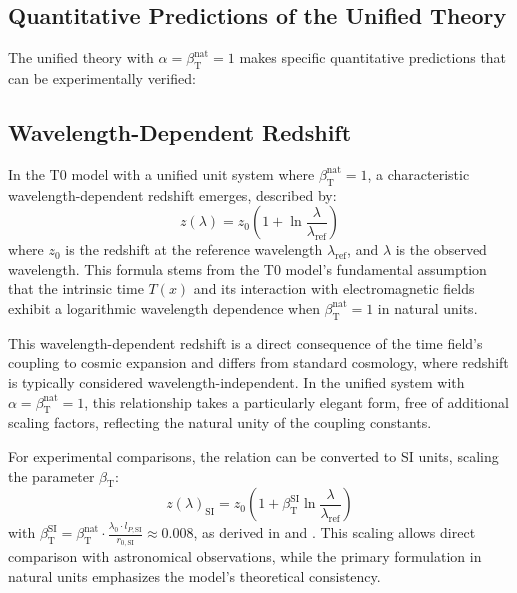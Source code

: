 ﻿\documentclass[12pt,a4paper]{article}
\newcommand{\Tfield}{T(x)}
\newcommand{\betaT}{\beta_{\text{T}}}
\begin{document}
	\subsection{Quantitative Predictions of the Unified Theory}
	
	The unified theory with \(\alpha = \betaT^{\text{nat}} = 1\) makes specific quantitative predictions that can be experimentally verified:
	
	\subsection{Wavelength-Dependent Redshift}
	
	In the T0 model with a unified unit system where \(\betaT^{\text{nat}} = 1\), a characteristic wavelength-dependent redshift emerges, described by:
	\begin{equation}
		z(\lambda) = z_0 \left(1 + \ln \frac{\lambda}{\lambda_{\text{ref}}}\right)
	\end{equation}
	where \(z_0\) is the redshift at the reference wavelength \(\lambda_{\text{ref}}\), and \(\lambda\) is the observed wavelength. This formula stems from the T0 model's fundamental assumption that the intrinsic time \(\Tfield\) and its interaction with electromagnetic fields exhibit a logarithmic wavelength dependence when \(\betaT^{\text{nat}} = 1\) in natural units.
	
	This wavelength-dependent redshift is a direct consequence of the time field's coupling to cosmic expansion and differs from standard cosmology, where redshift is typically considered wavelength-independent. In the unified system with \(\alpha = \betaT^{\text{nat}} = 1\), this relationship takes a particularly elegant form, free of additional scaling factors, reflecting the natural unity of the coupling constants.
	
	For experimental comparisons, the relation can be converted to SI units, scaling the parameter \(\betaT\):
	\begin{equation}
		z(\lambda)_{\text{SI}} = z_0 \left(1 + \betaT^{\text{SI}} \ln \frac{\lambda}{\lambda_{\text{ref}}}\right)
	\end{equation}
	with \(\betaT^{\text{SI}} = \betaT^{\text{nat}} \cdot \frac{\lambda_0 \cdot l_{P,\text{SI}}}{r_{0,\text{SI}}} \approx 0.008\), as derived in \cite{pascher_emergente_gravitation_2025} and \cite{pascher_params_2025}. This scaling allows direct comparison with astronomical observations, while the primary formulation in natural units emphasizes the model's theoretical consistency.
	
\end{document}
